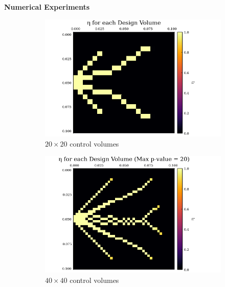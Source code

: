 \documentclass[final]{beamer}
\begin{document}
\begin{frame}{\textbf{Numerical Experiments}}
	\begin{figure}
		\begin{subfigure}{0.4\textwidth}
			\centering
			\includegraphics[width=1.1\linewidth]{20x20-Final_Design.png}
			\caption{$20\times 20$ control volumes}
			\label{fig:SIMP-Output-20}
		\end{subfigure}
		\begin{subfigure}{0.4\textwidth}
			\centering
			\includegraphics[width=1.1\linewidth]{40x40-Final_Design.png}
			\caption{$40\times 40$ control volumes}
			\label{fig:SIMP-Output-40}
		\end{subfigure}
		\begin{center}
			\begin{subfigure}{0.5\textwidth}
				\centering

\end{subfigure}
\end{center}
\end{figure}
\end{frame}
\end{document}
